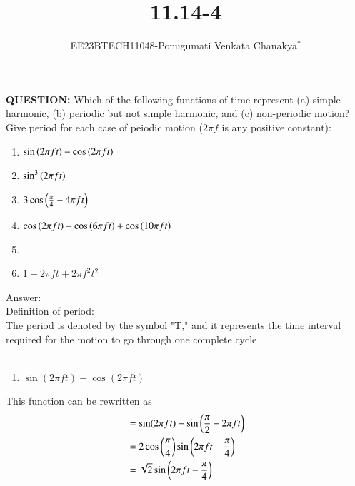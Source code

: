 \documentclass[journal,12pt,twocolumn]{IEEEtran}
\theoremstyle{remark}
\begin{document}
 
 \vspace{3cm}
 \title{\textbf{11.14-4}}
 \author{EE23BTECH11048-Ponugumati Venkata Chanakya$^{*}$%
 }
 \maketitle
 \newpage
 \bigskip
 \renewcommand{\thefigure}{\theenumi}
 \renewcommand{\thetable}{\theenumi}
 \textbf{QUESTION:}
 Which of the following functions of time represent (a) simple harmonic, (b) periodic
 but not simple harmonic, and (c) non-periodic motion? Give period for each case of
 peiodic motion ($2\pi f$ is any positive constant):\\
 \begin{enumerate}
 \item $\sin\left(2\pi f t\right)-\cos\left(2\pi f t\right)$\\
 \item $\sin^3\left(2\pi f t\right)$\\
 \item $3\cos\left(\frac{\pi}{4}- 4\pi f t\right)$\\
 \item $\cos\left(2\pi f t\right)+\cos\left(6\pi  f t\right)+\cos\left(10\pi  f t\right)$\\
 \item {}\\
 \item $1+2\pi f t+2\pi f^2 t^2$\\
  \end{enumerate}
 Answer:\\
   Definition of period:\\The period is denoted by the symbol "T," and it represents the time interval required for the motion to go through one complete cycle\\
   \\
   \begin{enumerate}
 \item $\sin(2\pi f t)- \cos(2\pi f t)$\\
  \end{enumerate}
  This function can be rewritten as\\ 
 \begin{align}
  &= \sin(2\pi f t) - \sin\left(\frac{\pi}{2} - 2\pi f t\right)\\
  &=2 \cos\left(\frac{\pi}{4}\right) \sin\left(2\pi f t - \frac{\pi}{4}\right)\\
  &=\sqrt{2}\sin\left(2\pi f t - \frac{\pi}{4}\right)
 \end{align}
\end{document}
